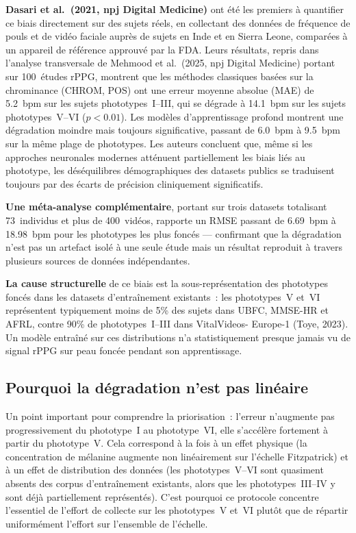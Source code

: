\documentclass[11pt,a4paper]{article}
\begin{document}
\textbf{Dasari et al.\ (2021, npj Digital Medicine)} ont \'et\'e les
premiers \`a quantifier ce biais directement sur des sujets r\'eels, en
collectant des donn\'ees de fr\'equence de pouls et de vid\'eo faciale auprès
de sujets en Inde et en Sierra Leone, compar\'ees \`a un appareil de
r\'ef\'erence approuv\'e par la FDA. Leurs r\'esultats, repris dans l'analyse
transversale de Mehmood et al.\ (2025, npj Digital Medicine) portant sur
100~\'etudes rPPG, montrent que les m\'ethodes classiques bas\'ees sur la
chrominance (CHROM, POS) ont une erreur moyenne absolue (MAE) de 5.2~bpm sur
les sujets phototypes~I--III, qui se d\'egrade \`a 14.1~bpm sur les sujets
phototypes~V--VI ($p<0.01$). Les mod\`eles d'apprentissage profond montrent
une d\'egradation moindre mais toujours significative, passant de 6.0~bpm \`a
9.5~bpm sur la m\^eme plage de phototypes. Les auteurs concluent que,
m\^eme si les approches neuronales modernes att\'enuent partiellement les
biais li\'es au phototype, les d\'es\'equilibres d\'emographiques des
datasets publics se traduisent toujours par des \'ecarts de pr\'ecision
cliniquement significatifs.

\textbf{Une m\'eta-analyse compl\'ementaire}, portant sur trois datasets
totalisant 73~individus et plus de 400~vid\'eos, rapporte un RMSE passant de
6.69~bpm \`a 18.98~bpm pour les phototypes les plus fonc\'es --- confirmant
que la d\'egradation n'est pas un artefact isol\'e \`a une seule \'etude
mais un r\'esultat reproduit \`a travers plusieurs sources de donn\'ees
ind\'ependantes.

\textbf{La cause structurelle} de ce biais est la sous-repr\'esentation des
phototypes fonc\'es dans les datasets d'entra\^inement existants~: les
phototypes~V et~VI repr\'esentent typiquement moins de 5\% des sujets dans
UBFC, MMSE-HR et AFRL, contre 90\% de phototypes~I--III dans VitalVideos-
Europe-1 (Toye, 2023). Un mod\`ele entra\^in\'e sur ces distributions n'a
statistiquement presque jamais vu de signal rPPG sur peau fonc\'ee pendant
son apprentissage.

\subsection{Pourquoi la d\'egradation n'est pas lin\'eaire}

Un point important pour comprendre la priorisation~: l'erreur n'augmente
pas progressivement du phototype~I au phototype~VI, elle s'acc\'el\`ere
fortement \`a partir du phototype~V. Cela correspond \`a la fois \`a un
effet physique (la concentration de m\'elanine augmente non lin\'eairement
sur l'\'echelle Fitzpatrick) et \`a un effet de distribution des donn\'ees
(les phototypes~V--VI sont quasiment absents des corpus d'entra\^inement
existants, alors que les phototypes~III--IV y sont d\'ej\`a partiellement
repr\'esent\'es). C'est pourquoi ce protocole concentre l'essentiel de
l'effort de collecte sur les phototypes~V et~VI plut\^ot que de r\'epartir
uniform\'ement l'effort sur l'ensemble de l'\'echelle.
\end{document}
